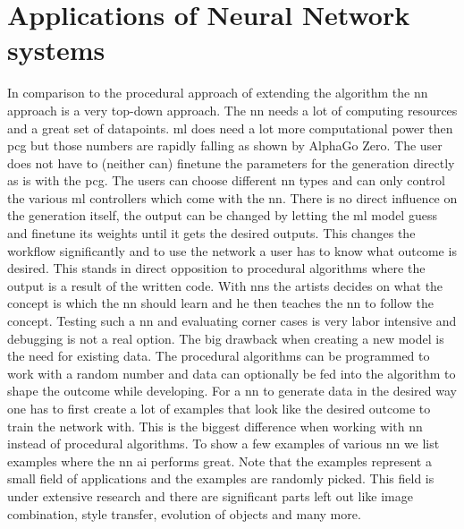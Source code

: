\documentclass[10pt,a4paper]{article}
\begin{document}
\section{Applications of Neural Network systems}
In comparison to the procedural approach of extending the algorithm the \gls{nn} approach is a very top-down approach. The \gls{nn} needs a lot of computing resources and a great set of datapoints. \gls{ml} does need a lot more computational power then \gls{pcg} but those numbers are rapidly falling as shown by AlphaGo Zero\citep{Silver2017}. The user does not have to (neither can) finetune the parameters for the generation directly as is with the \gls{pcg}. The users can choose different \gls{nn} types and can only control the various \gls{ml} controllers which come with the \gls{nn}. There is no direct influence on the generation itself, the output can be changed by letting the \gls{ml} model guess and finetune its weights until it gets the desired outputs. This changes the workflow significantly and to use the network a user has to know what outcome is desired. This stands in direct opposition to procedural algorithms where the output is a result of the written code. With \gls{nn}s the artists decides on what the concept is which the \gls{nn} should learn and he then teaches the \gls{nn} to follow the concept. Testing such a \gls{nn} and evaluating corner cases is very labor intensive and debugging is not a real option. The big drawback when creating a new model is the need for existing data. The procedural algorithms can be programmed to work with a random number and data can optionally be fed into the algorithm to shape the outcome while developing. For a \gls{nn} to generate data in the desired way one has to first create a lot of examples that look like the desired outcome to train the network with. This is the biggest difference when working with \gls{nn} instead of procedural algorithms. To show a few examples of various \gls{nn} we list examples where the \gls{nn} \gls{ai} performs great. Note that the examples represent a small field of applications and the examples are randomly picked. This field is under extensive research and there are significant parts left out like image combination\cite{Luan2018}, style transfer, evolution of objects and many more.
\end{document}
